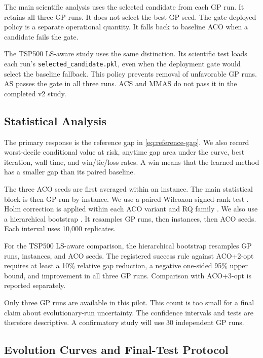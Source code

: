 \documentclass[letterpaper,journal]{IEEEtran}
\begin{document}
The main scientific analysis uses the selected candidate from each GP run.
It retains all three GP runs.
It does not select the best GP seed.
The gate-deployed policy is a separate operational quantity.
It falls back to baseline ACO when a candidate fails the gate.

The TSP500 LS-aware study uses the same distinction.
Its scientific test loads each run's
\texttt{selected\_candidate.pkl}, even when the deployment gate would select
the baseline fallback.
This policy prevents removal of unfavorable GP runs.
AS passes the gate in all three runs.
ACS and MMAS do not pass it in the completed v2 study.

\subsection{Statistical Analysis}

The primary response is the reference gap in \eqref{eq:reference-gap}.
We also record worst-decile conditional value at risk, anytime gap area under the curve, best iteration, wall time, and win/tie/loss rates.
A win means that the learned method has a smaller gap than its paired baseline.

The three ACO seeds are first averaged within an instance.
The main statistical block is then GP-run by instance.
We use a paired Wilcoxon signed-rank test \cite{wilcoxon1945}.
Holm correction is applied within each ACO variant and RQ family \cite{holm1979}.
We also use a hierarchical bootstrap \cite{efron1994bootstrap}.
It resamples GP runs, then instances, then ACO seeds.
Each interval uses 10,000 replicates.

For the TSP500 LS-aware comparison, the hierarchical bootstrap resamples GP
runs, instances, and ACO seeds.
The registered success rule against ACO+2-opt requires at least a 10\%
relative gap reduction, a negative one-sided 95\% upper bound, and improvement
in all three GP runs.
Comparison with ACO+3-opt is reported separately.

Only three GP runs are available in this pilot.
This count is too small for a final claim about evolutionary-run uncertainty.
The confidence intervals and tests are therefore descriptive.
A confirmatory study will use 30 independent GP runs.

\subsection{Evolution Curves and Final-Test Protocol}
\end{document}
